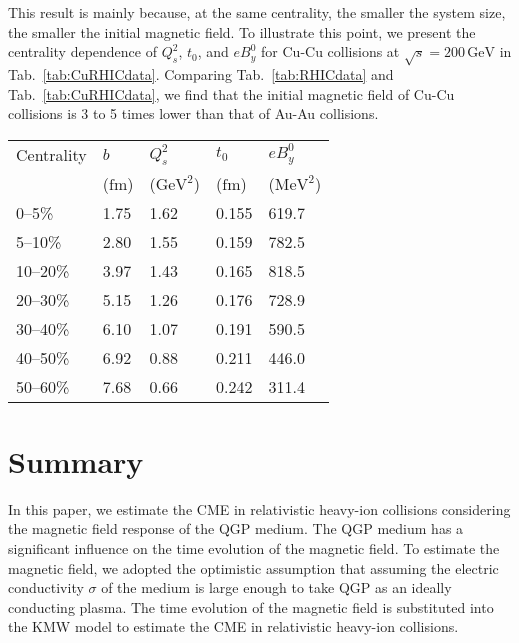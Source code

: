 \documentclass[a4paper,10pt,twoside]{cpc-hepnp}
\begin{document}
\begin{CJK*}{GBK}{song}
\begin{multicols}{2}
This result is mainly because, at the same centrality, the smaller the system size, the smaller the initial magnetic field. To illustrate this point, we present the centrality dependence of $Q_s^2$, $t_0$, and $eB_y^0$ for Cu-Cu collisions at $\sqrt{s} = 200\,\mathrm{GeV}$ in Tab.~\ref{tab:CuRHICdata}. Comparing Tab.~\ref{tab:RHICdata} and Tab.~\ref{tab:CuRHICdata}, we find that the initial magnetic field of Cu-Cu collisions is 3 to 5 times lower than that of Au-Au collisions.


\begin{center}
\footnotesize
\begin{tabular}{lllll}
\toprule
  Centrality & $b$ & $Q_s^2$ & $t_0$ & $eB_y^0$ \\
             & ($\mathrm{fm}$)  &  ($\mathrm{GeV}^2$) & ($\mathrm{fm}$) & ($\mathrm{MeV}^2$) \\
\hline
0--5\% & 1.75 & 1.62 & 0.155 & 619.7 \\
5--10\% & 2.80 & 1.55 & 0.159 & 782.5 \\
10--20\% & 3.97 & 1.43 & 0.165 & 818.5 \\
20--30\% & 5.15 & 1.26 & 0.176 & 728.9 \\
30--40\% & 6.10 & 1.07 & 0.191 & 590.5 \\
40--50\% & 6.92 & 0.88 & 0.211 & 446.0 \\
50--60\% & 7.68 & 0.66 & 0.242 & 311.4 \\
  \bottomrule
\end{tabular}
\end{center}


\section{Summary}\label{summary}
In this paper, we estimate the CME in relativistic heavy-ion collisions considering the magnetic field response of the QGP medium. The QGP medium has a significant influence on the time evolution of the magnetic field. To estimate the magnetic field, we adopted the optimistic assumption that assuming the electric conductivity $\sigma$ of the medium is large enough to take QGP as an ideally conducting plasma. The time evolution of the magnetic field is substituted into the KMW model to estimate the CME in relativistic heavy-ion collisions.


\end{multicols}
\end{CJK*}
\end{document}
